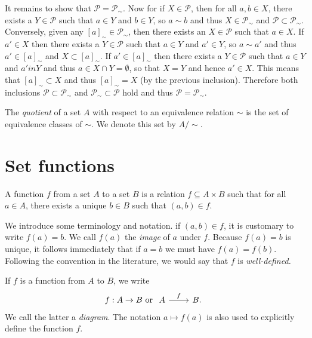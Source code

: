 It remains to show that \(\mathcal{P} = \mathcal{P}_{\sim}\). Now for if \(X \in
\mathcal{P}\), then for all \(a, b \in X\), there exists a \(Y \in \mathcal{P}\)
such that \(a \in Y\) and \(b \in Y\), so \(a \sim b\) and thus \(X \in
\mathcal{P}_{\sim}\) and \(\mathcal{P} \subset \mathcal{P}_{\sim}\). Conversely,
given any \([a]_{\sim} \in \mathcal{P}_{\sim}\), then there exists an \(X \in
\mathcal{P}\) such that \(a \in X\). If \(a' \in X\) then there exists a \(Y \in
\mathcal{P}\) such that \(a \in Y\) and \(a' \in Y\), so \(a \sim a'\) and thus
\(a' \in [a]_{\sim}\) and \(X \subset [a]_{\sim}\). If \(a' \in [a]_{\sim}\)
then there exists a \(Y \in \mathcal{P}\) such that \(a \in Y\) and \(a' in Y\)
and thus \(a \in X \cap Y = \emptyset\), so that \(X = Y\) and hence \(a' \in
X\). This means that \([a]_{\sim} \subset X\) and thus \([a]_{\sim} = X\) (by
the previous inclusion). Therefore both inclusions \(\mathcal{P} \subset
\mathcal{P}_{\sim}\) and \(\mathcal{P}_{\sim} \subset \mathcal{P}\) hold and
thus \(\mathcal{P} = \mathcal{P}_{\sim}\).

\begin{definition}
    The \emph{quotient} of a set \(A\) with respect to an equivalence relation
    \(\sim\) is the set of equivalence classes of \(\sim\). We denote this set
    by \(A/\sim\).
\end{definition}

\section{Set functions}
\label{sec:set-functions}

\begin{definition}
    A function \(f\) from a set \(A\) to a set \(B\) is a relation \(f \subseteq
    A \times B\) such that for all \(a \in A\), there exists a unique \(b \in
    B\) such that \((a, b) \in f\).
\end{definition}

We introduce some terminology and notation. if \((a, b) \in f\), it is customary
to write \(f(a) = b\). We call \(f(a)\) the \emph{image} of \(a\) under \(f\).
Because \(f(a) = b\) is unique, it follows immediately that if \(a = b\) we must
have \(f(a) = f(b)\). Following the convention in the literature, we would say
that \(f\) is \emph{well-defined.}

If \(f\) is a function from \(A\) to \(B\), we write
\[
    f: A \to B \text{ or } \begin{tikzcd}
        A \arrow[r, "f"] & B.
    \end{tikzcd}
\]
We call the latter a \emph{diagram}. The notation \(a \mapsto f(a)\) is also
used to explicitly define the function \(f\).

